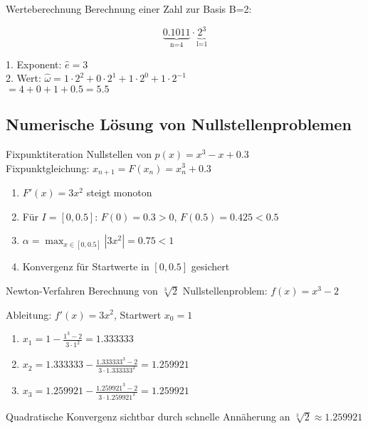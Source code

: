 \begin{example2}{Werteberechnung} Berechnung einer Zahl zur Basis B=2:
\begin{minipage}{0.45\textwidth}
    $$\underbrace{0.1011}_{\text{n=4}} \cdot \underbrace{2^{3}}_{\text{l=1}}$$
\end{minipage}
\begin{minipage}[t]{0.5\textwidth}
    1. Exponent: $\hat{e} = 3$ \\ 
    2. Wert: $\hat{\omega} = 1\cdot2^2 + 0\cdot2^1 + 1\cdot2^0 + 1\cdot2^{-1}$ \\
    $= 4 + 0 + 1 + 0.5 = 5.5$
\end{minipage}
\end{example2}

\subsection{Numerische Lösung von Nullstellenproblemen}

\begin{example2}{Fixpunktiteration} Nullstellen von $p(x)=x^3-x+0.3$\\
Fixpunktgleichung: $x_{n+1} = F(x_n) = x_n^3 + 0.3$
\begin{enumerate}
    \item $F'(x) = 3x^2$ steigt monoton
    \item Für $I=[0,0.5]$: $F(0)=0.3 > 0$, $F(0.5)=0.425 < 0.5$
    \item $\alpha = \max_{x \in [0,0.5]} |3x^2| = 0.75 < 1$
    \item Konvergenz für Startwerte in $[0,0.5]$ gesichert
\end{enumerate}
\end{example2}



\begin{example2}{Newton-Verfahren} Berechnung von $\sqrt[3]{2}$
Nullstellenproblem: $f(x)=x^3-2$
\vspace{1mm}\\
\begin{minipage}[t]{0.65\textwidth}
    \vspace{-3mm}
    Ableitung: $f'(x)=3x^2$, Startwert $x_0=1$
    \begin{enumerate}
        \item $x_1 = 1 - \frac{1^3-2}{3 \cdot 1^2} = 1.333333$
        \item $x_2 = 1.333333 - \frac{1.333333^3-2}{3 \cdot 1.333333^2} = 1.259921$
        \item $x_3 = 1.259921 - \frac{1.259921^3-2}{3 \cdot 1.259921^2} = 1.259921$
    \end{enumerate}
\end{minipage}
\begin{minipage}[t]{0.3\textwidth}
    Quadratische Konvergenz sichtbar durch schnelle Annäherung an $\sqrt[3]{2} \approx 1.259921$
\end{minipage}
\end{example2}


